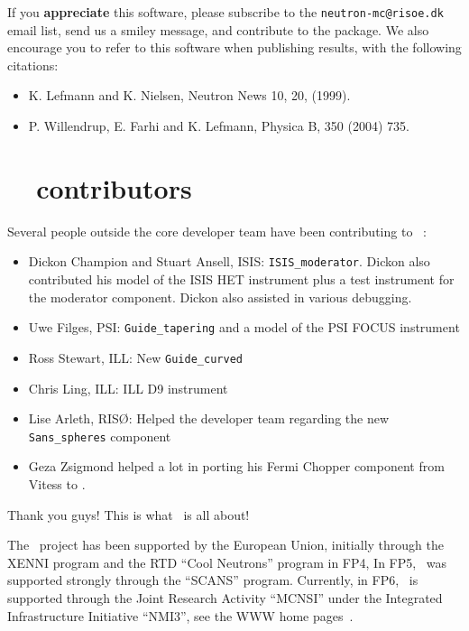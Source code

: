 If you {\bf appreciate} this software, please subscribe to the \verb+neutron-mc@risoe.dk+ email list, send us a smiley message, and contribute to the package. We also encourage you to refer to this software when publishing results, with the following citations:
\begin{itemize}
\item{K. Lefmann and K. Nielsen, Neutron News 10, 20, (1999).}
\item{P. Willendrup, E. Farhi and K. Lefmann, Physica B, 350 (2004) 735.}
\end{itemize}


\section*{\MCS\ \version\ contributors}
Several people outside the core developer team have been contributing
to \MCS\ \version:
\begin{itemize}
\item{Dickon Champion and Stuart Ansell, ISIS:
    \verb+ISIS_moderator+. Dickon also contributed his model of the
    ISIS HET instrument plus a test instrument for the moderator
    component. Dickon also assisted in various debugging.}
\item{Uwe Filges, PSI: \verb+Guide_tapering+ and a model of the PSI
    FOCUS instrument}
\item{Ross Stewart, ILL: New \verb+Guide_curved+}
\item{Chris Ling, ILL: ILL D9 instrument}
\item{Lise Arleth, RIS\O: Helped the developer team regarding the new
  \verb+Sans_spheres+ component}
\item{Geza Zsigmond helped a lot in porting his Fermi Chopper component from Vitess \cite{Vitess, vitess_webpage} to \MCS .}
\end{itemize}
Thank you guys! This is what \MCS\ is all about!

The \MCS\ project has been supported by the European Union, initially
through the XENNI program and the RTD ``Cool Neutrons'' program in FP4,
In FP5, \MCS\ was supported strongly through the
``SCANS'' program.
Currently, in FP6, \MCS\ is supported through the Joint Research Activity
``MCNSI'' under the Integrated Infrastructure Initiative ``NMI3'', see
the WWW home pages~\cite{mcnsi_webpage,nmi3_webpage}.
